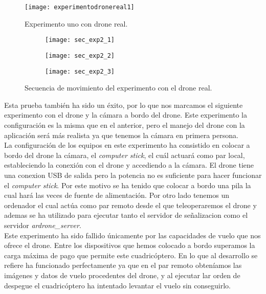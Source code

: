 \begin{figure}[h!]
\centering
\texttt{[image: experimentodronereal1]}
\caption{Experimento uno con drone real.}
\label{fig:experimentodronereal1}
\end{figure}


\begin{figure}[h!]
\centering
  \begin{subfigure}[]{48mm}
    \texttt{[image: sec\_exp2\_1]}
  \end{subfigure}
  \hspace{1pt}
  \begin{subfigure}[]{48mm}
    \texttt{[image: sec\_exp2\_2]}
  \end{subfigure}
    \hspace{1pt}
    \begin{subfigure}[]{48mm}
    \texttt{[image: sec\_exp2\_3]}
  \end{subfigure}
    \caption{Secuencia de movimiento del experimento con el drone real.}
  \label{fig:secexp2}
\end{figure}


Esta prueba también ha sido un éxito, por lo que nos marcamos el siguiente experimento con el drone y la cámara a bordo del drone. Este experimento la configuración es la misma que en el anterior, pero el manejo del drone con la aplicación será más realista ya que tenemos la cámara en primera persona.\\

La configuración de los equipos en este experimento ha consistido en colocar a bordo del drone la cámara, el \emph{computer stick}, el cuál actuará como par local, estableciendo la conexión con el drone y accediendo a la cámara. El drone tiene una conexion USB de salida pero la potencia no es suficiente para hacer funcionar el \emph{computer stick}. Por este motivo se ha tenido que colocar a bordo una pila la cual hará las veces de fuente de alimentación. Por otro lado tenemos un ordenador el cual actúa como par remoto desde el que teleoperaremos el drone y ademas se ha utilizado para ejecutar tanto el servidor de señalizacion como el servidor \emph{ardrone\_server}.\\

Este experimento ha sido fallido únicamente por las capacidades de vuelo que nos ofrece el drone. Entre los dispositivos que hemos colocado a bordo superamos la carga máxima de pago que permite este cuadricóptero. En lo que al desarrollo se refiere ha funcionado perfectamente ya que en el par remoto obteníamos las imágenes y datos de vuelo procedentes del drone, y al ejecutar lar orden de despegue el cuadricóptero ha intentado levantar el vuelo sin conseguirlo.\\

